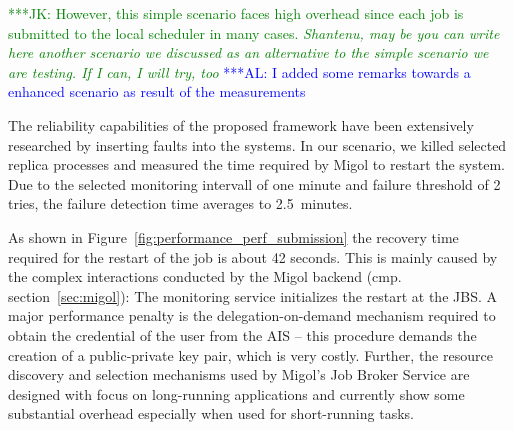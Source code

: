 \documentclass[conference,final]{IEEEtran}
\newcommand{\kimnote}[1]{ {\textcolor{green} { ***JK: #1 }}}
\newcommand{\alnote}[1]{ {\textcolor{blue} { ***AL: #1 }}}
\newcommand{\kimnote}[1]{}
\newcommand{\alnote}[1]{}
\begin{document}
\kimnote{However, this simple scenario faces high overhead since each
  job is submitted to the local scheduler in many cases. \it
  Shantenu, may be you can write here another scenario we discussed
  as an alternative to the simple scenario we are testing.  If I can,
  I will try, too }            
\alnote{I added some remarks towards a enhanced scenario as result of the measurements}  

The reliability capabilities of the proposed framework have
been extensively researched by inserting faults into the
systems. In our scenario, we killed selected replica processes and
measured the time required by Migol to restart the system.  Due to
the selected monitoring intervall of one minute and failure threshold
of 2 tries, the failure detection time averages to 2.5\, minutes.

As shown in Figure~\ref{fig:performance_perf_submission} the recovery
time required for the restart of the job is about 42 seconds. This is
mainly caused by the complex interactions conducted by the Migol
backend (cmp. section~\ref{sec:migol}): The monitoring service
initializes the restart at the JBS.  A major performance penalty is
the delegation-on-demand mechanism required to obtain the credential
of the user from the AIS -- this procedure demands the creation of a
public-private key pair, which is very costly. Further, the resource
discovery and selection mechanisms used by Migol's Job Broker Service are designed 
with focus on long-running applications and currently show some substantial 
overhead especially when used for short-running tasks.


\end{document}
